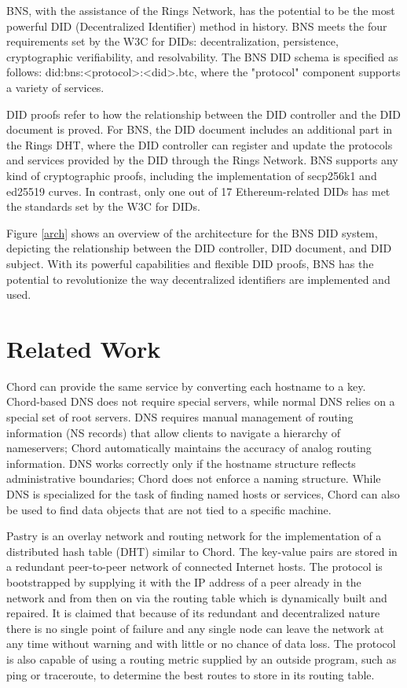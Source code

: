 \documentclass[twocolumn]{article}
\begin{document}
BNS, with the assistance of the Rings Network, has the potential to be the most powerful DID (Decentralized Identifier) method in history. BNS meets the four requirements set by the W3C for DIDs: decentralization, persistence, cryptographic verifiability, and resolvability. The BNS DID schema is specified as follows: did:bns:<protocol>:<did>.btc, where the "protocol" component supports a variety of services.

DID proofs refer to how the relationship between the DID controller and the DID document is proved. For BNS, the DID document includes an additional part in the Rings DHT, where the DID controller can register and update the protocols and services provided by the DID through the Rings Network. BNS supports any kind of cryptographic proofs, including the implementation of secp256k1 and ed25519 curves. In contrast, only one out of 17 Ethereum-related DIDs has met the standards set by the W3C for DIDs.

Figure \ref{arch} shows an overview of the architecture for the BNS DID system, depicting the relationship between the DID controller, DID document, and DID subject. With its powerful capabilities and flexible DID proofs, BNS has the potential to revolutionize the way decentralized identifiers are implemented and used.

\section{Related Work}


Chord can provide the same service by converting each hostname to a key. Chord-based\cite{chord} DNS does not require special servers, while normal DNS relies on a special set of root servers. DNS requires manual management of routing information (NS records) that allow clients to navigate a hierarchy of nameservers; Chord automatically maintains the accuracy of analog routing information. DNS works correctly only if the hostname structure reflects administrative boundaries; Chord does not enforce a naming structure. While DNS is specialized for the task of finding named hosts or services, Chord can also be used to find data objects that are not tied to a specific machine.

Pastry is an overlay network and routing network for the implementation of a distributed hash table (DHT) similar to Chord. The key-value pairs are stored in a redundant peer-to-peer network of connected Internet hosts. The protocol is bootstrapped by supplying it with the IP address of a peer already in the network and from then on via the routing table which is dynamically built and repaired. It is claimed that because of its redundant and decentralized nature there is no single point of failure and any single node can leave the network at any time without warning and with little or no chance of data loss. The protocol is also capable of using a routing metric supplied by an outside program, such as ping or traceroute, to determine the best routes to store in its routing table.
\end{document}
